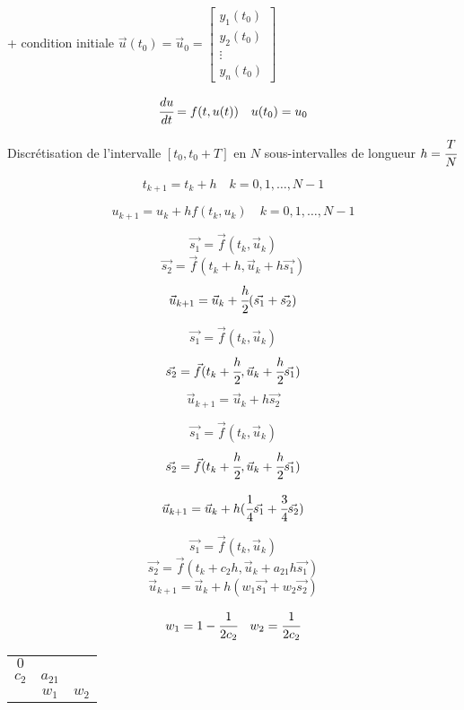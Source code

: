 + condition initiale $\vec{u}(t_0) = \vec{u}_0 = \begin{bmatrix}
    y_1(t_0) \\
    y_2(t_0) \\
    \vdots \\
    y_n(t_0)
\end{bmatrix}$


$$ \cfrac{du}{dt} = f(t, u(t)) \quad u(t_0) = u_0 $$

Discrétisation de l'intervalle $[t_0, t_0 + T]$ en $N$ sous-intervalles de longueur $h = \cfrac{T}{N}$

$$ t_{k+1} = t_k + h \quad k = 0, 1, \dots, N-1 $$

$$ u_{k+1} = u_k + h f(t_k, u_k) \quad k = 0, 1, \dots, N-1 $$


$$ \vec{s_1} = \vec{f}(t_k, \vec{u}_k) $$
$$ \vec{s_2} = \vec{f}(t_k + h, \vec{u}_k + h \vec{s_1}) $$
$$ \vec{u}_{k+1} = \vec{u}_k + \cfrac{h}{2} (\vec{s_1} + \vec{s_2}) $$


$$ \vec{s_1} = \vec{f}(t_k, \vec{u}_k) $$
$$ \vec{s_2} = \vec{f}(t_k + \cfrac{h}{2}, \vec{u}_k + \cfrac{h}{2} \vec{s_1}) $$
$$ \vec{u}_{k+1} = \vec{u}_k + h \vec{s_2} $$


$$ \vec{s_1} = \vec{f}(t_k, \vec{u}_k) $$
$$ \vec{s_2} = \vec{f}(t_k + \cfrac{h}{2}, \vec{u}_k + \cfrac{h}{2} \vec{s_1}) $$

$$ \vec{u}_{k+1} = \vec{u}_k + h (\cfrac{1}{4} \vec{s_1} + \cfrac{3}{4} \vec{s_2}) $$


$$ \vec{s_1} = \vec{f}(t_k, \vec{u}_k) $$
$$ \vec{s_2} = \vec{f}(t_k + c_2 h, \vec{u}_k + a_{21} h \vec{s_1}) $$
$$ \vec{u}_{k+1} = \vec{u}_k + h (w_1 \vec{s_1} + w_2 \vec{s_2}) $$

$$ w_1 = 1 - \cfrac{1}{2c_2} \quad w_2 = \cfrac{1}{2c_2} $$

\begin{tabular}{c|cc}
    $0$ &  &  \\
    $c_2$ & $a_{21}$ &  \\
    \hline
          & $w_1$    & $w_2$ \\
\end{tabular}


